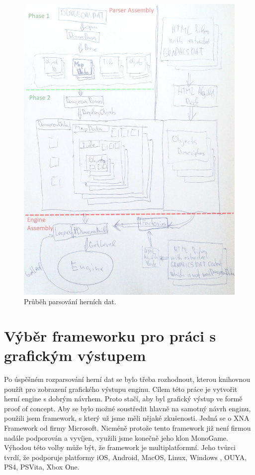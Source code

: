 \begin{figure}[H]\centering
\includegraphics[width=\textwidth]{./img/DM-parser.png}
\caption{Průběh parsování herních dat.}
\label{parser:analyza}
\end{figure}

\section{Výběr frameworku pro práci s grafickým výstupem}

Po úspěšném rozparsování herní dat se bylo třeba rozhodnout, kterou knihovnou použít pro zobrazení grafického výstupu enginu. 
Cílem této práce je vytvořit herní engine s dobrým návrhem. Proto stačí, aby byl grafický výstup ve formě proof of concept. 
Aby se bylo možné soustředit hlavně na samotný návrh enginu, použili jsem framework, s který už jsme měli nějaké zkušenosti.
Jedná se o XNA Framework od firmy Microsoft. Nicméně protože tento framework již není firmou nadále podporován a vyvíjen, využili jsme 
konečně jeho klon MonoGame\cite{MonoGame}. Výhodou této volby může být, že framework je multiplatformní. Jeho tvůrci tvrdí, že podporuje platformy
iOS, Android, MacOS, Linux, Windows , OUYA, PS4, PSVita, Xbox One.

